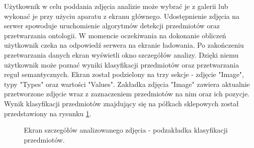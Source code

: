 {Użytkownik w celu poddania zdjęcia analizie może wybrać je z galerii lub wykonać je przy użyciu aparatu z ekranu głównego. Udostępnienie zdjęcia na serwer spowoduje uruchomienie algorytmów detekcji przedmiotów oraz przetwarzania ontologii. W momencie oczekiwania na dokonanie obliczeń użytkownik czeka na odpowiedź serwera na ekranie ładowania. Po zakończeniu przetwarzania danych ekran wyświetli okno szczegółów analizy. Dzięki niemu użytkownik może poznać wyniki klasyfikacji przedmiotów oraz przetwarzania reguł semantycznych. Ekran został podzielony na trzy sekcje - zdjęcie "Image", typy "Types" oraz wartości "Values". Zakładka zdjęcia "Image" zawiera aktualnie przetworzone zdjęcie wraz z zaznaczeniem przedmiotów na nim oraz ich pozycje. Wynik klasyfikacji przedmiotów znajdujący się na półkach sklepowych został przedstawiony na rysunku \ref{fig:classificationImages}. 
\begin{figure}[h]
	\centering
	\quad
	\caption{Ekran szczegółów analizowanego zdjęcia - podzakładka klasyfikacji przedmiotów.}
	\label{fig:classificationImages}
	

\end{figure}}
